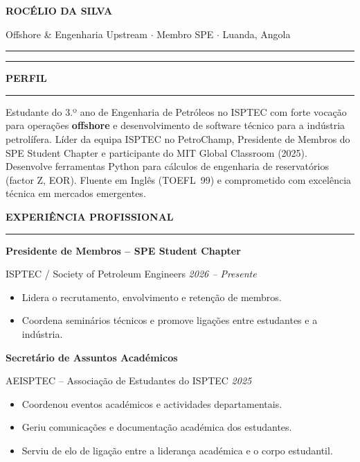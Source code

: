 \documentclass[10pt,a4paper]{article}
\newcommand{\mainSection}[1]{%
  \vspace{1pt}%
  {\bfseries\color{navy}\large\MakeUppercase{#1}}%
  \par\vspace{0pt}%
  {\color{navy}\rule{\linewidth}{1.0pt}}%
  \par\vspace{1pt}%
}
\newcommand{\expEntry}[3]{%
  {\bfseries\color{navy}\normalsize #1}\par\vspace{1pt}%
  {\color{mutedtext}\small #2 \hfill \textit{\color{navylt}#3}}\par\vspace{1pt}%
}
\begin{document}
\begin{minipage}[t]{\dimexpr 0.705\paperwidth - 26pt}
  \color{bodytext}
  \setlength{\parskip}{2pt}

  \vspace{5pt}

  {\huge\bfseries\color{navy} ROCÉLIO DA SILVA}\par
  \vspace{2pt}
  {\normalsize\color{mutedtext}
    Offshore \& Engenharia Upstream
    $\cdot$ Membro SPE
    $\cdot$ Luanda, Angola
  }\par
  \vspace{2pt}
  {\color{navy}\rule{\linewidth}{1.2pt}}\par
  \vspace{1pt}
  {\color{goldrule}\rule{\linewidth}{0.4pt}}

  \mainSection{Perfil}
  Estudante do 3.º ano de Engenharia de Petróleos no ISPTEC com forte vocação para
  operações \textbf{offshore} e desenvolvimento de software técnico para a indústria
  petrolífera. Líder da equipa ISPTEC no PetroChamp, Presidente de Membros do SPE
  Student Chapter e participante do MIT Global Classroom (2025). Desenvolve ferramentas
  Python para cálculos de engenharia de reservatórios (factor Z, EOR). Fluente em
  Inglês (TOEFL~99) e comprometido com excelência técnica em mercados emergentes.

  \mainSection{Experiência Profissional}

  \expEntry{Presidente de Membros -- SPE Student Chapter}%
           {ISPTEC / Society of Petroleum Engineers}%
           {2026 -- Presente}
  \begin{itemize}
    \item Lidera o recrutamento, envolvimento e retenção de membros.
    \item Coordena seminários técnicos e promove ligações entre estudantes e a indústria.
  \end{itemize}

  \vspace{2pt}
  \expEntry{Secretário de Assuntos Académicos}%
           {AEISPTEC -- Associação de Estudantes do ISPTEC}%
           {2025}
  \begin{itemize}
    \item Coordenou eventos académicos e actividades departamentais.
    \item Geriu comunicações e documentação académica dos estudantes.
    \item Serviu de elo de ligação entre a liderança académica e o corpo estudantil.
  \end{itemize}


\end{minipage}
\end{document}
